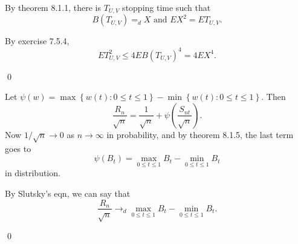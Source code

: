 \begin{problem}[8.1.1] \hfill

	By theorem 8.1.1, there is $T_{U, V}$ stopping time such that
	\[
		B(T_{U, V}) =_d X \text{ and } EX^2 = ET_{U, V}.
	\]

	By exercise 7.5.4,
	\[
		ET_{U, V}^2 \le 4 EB(T_{U, V})^4 = 4EX^4.
	\]

	\qed
\end{problem}

\begin{problem}[8.1.2] \hfill

	Let $\psi(w) = \max\left\{ w(t): 0\le t \le 1 \right\} - \min\left\{ w(t): 0\le t\le 1 \right\}$.
	Then
	\[
		\frac{R_n}{\sqrt{n}} = \frac{1}{\sqrt{n}} + \psi\left( \frac{ S_{nt}}{\sqrt{n}} \right).
	\]
	Now $1/\sqrt{n} \rightarrow 0$ as $n\rightarrow \infty$ in probability, and by theorem 8.1.5,
	the last term goes to
	\[
		\psi(B_t) = \max_{0\le t \le 1}B_t - \min_{0 \le t \le 1}B_t
	\]
	in distribution.

	By Slutsky's eqn, we can say that
	\[
		\frac{R_n}{\sqrt{n}} \rightarrow _d \max_{0\le t \le 1}B_t - \min_{0\le t\le 1}B_t.
	\]
	
	\qed
\end{problem}
